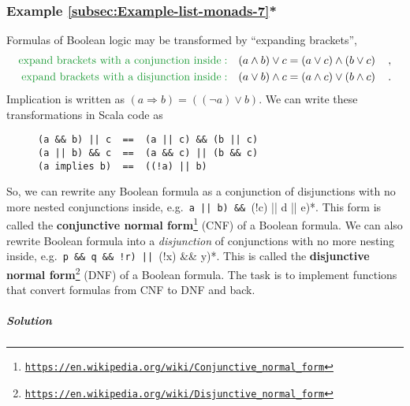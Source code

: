\subsubsection{Example \label{subsec:Example-list-monads-7}\ref{subsec:Example-list-monads-7}{*}}

Formulas of Boolean logic may be transformed by \textsf{``}expanding brackets\textsf{''},
\begin{align*}
{\color{greenunder}\text{expand brackets with a conjunction inside}:}\quad & (a\wedge b)\vee c=\left(a\vee c\right)\wedge\left(b\vee c\right)\quad,\\
{\color{greenunder}\text{expand brackets with a disjunction inside}:}\quad & (a\vee b)\wedge c=\left(a\wedge c\right)\vee\left(b\wedge c\right)\quad.
\end{align*}
Implication is written as $(a\Rightarrow b)=((\neg a)\vee b)$. We
can write these transformations in Scala code as

\begin{wrapfigure}{l}{0.4\columnwidth}%
\vspace{-0.6\baselineskip}
\begin{lstlisting}
(a && b) || c  ==  (a || c) && (b || c)
(a || b) && c  ==  (a && c) || (b && c)
(a implies b)  ==  ((!a) || b)
\end{lstlisting}
\vspace{-0.8\baselineskip}
\end{wrapfigure}%

\noindent So, we can rewrite any Boolean formula as a conjunction
of disjunctions with no more nested conjunctions inside, e.g.~\lstinline*(a || b) && ((!c) || d || e)*.
This form is called the \textbf{conjunctive normal form}\footnote{\texttt{\href{https://en.wikipedia.org/wiki/Conjunctive_normal_form}{https://en.wikipedia.org/wiki/Conjunctive\_normal\_form}}}
(CNF) of a Boolean formula. We can also rewrite Boolean formula into
a \emph{disjunction} of conjunctions with no more nesting inside,
e.g.~\lstinline*(p && q && !r) || ((!x) && y)*. This is called the
\textbf{disjunctive normal form}\footnote{\texttt{\href{https://en.wikipedia.org/wiki/Disjunctive_normal_form}{https://en.wikipedia.org/wiki/Disjunctive\_normal\_form}}}
(DNF) of a Boolean formula. The task is to implement functions that
convert formulas from CNF to DNF and back. 

\subparagraph{Solution}

